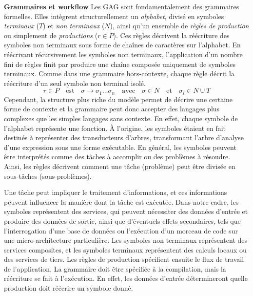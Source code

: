\textbf{Grammaires et workflow}
Les GAG sont fondamentalement des grammaires formelles. Elles intègrent structurellement un \textit{alphabet}, divisé en symboles \textit{terminaux} ($T$) et \textit{non terminaux} ($N$), ainsi qu'un ensemble de \textit{règles de production} ou simplement de \textit{productions} ($r \in P$). Ces règles décrivent la réécriture des symboles non terminaux sous forme de chaînes de caractères sur l'alphabet. En réécrivant récursivement les symboles non terminaux, l'application d'un nombre fini de règles finit par produire une chaîne composée uniquement de symboles terminaux. Comme dans une grammaire hors-contexte, chaque règle décrit la réécriture d'un seul symbole non terminal isolé. 
\begin{equation}
    r \in P \quad \text{est} \quad \sigma \rightarrow \sigma_1 \ldots \sigma_n \quad \text{avec} \quad \sigma \in N \quad \text{et} \quad \sigma_i \in N \cup T 
\end{equation}
Cependant, la structure plus riche du modèle permet de décrire une certaine forme de contexte et la grammaire peut donc accepter des langages plus complexes que les simples langages sans contexte. En effet, chaque symbole de l'alphabet représente une fonction. À l'origine, les symboles étaient en fait destinés à représenter des transducteurs d'arbres, transformant l'arbre d'analyse d'une expression sous une forme exécutable. En général, les symboles peuvent être interprétés comme des tâches à accomplir ou des problèmes à résoudre. Ainsi, les règles décrivent comment une tâche (problème) peut être divisée en sous-tâches (sous-problèmes). 

Une tâche peut impliquer le traitement d'informations, et ces informations peuvent influencer la manière dont la tâche est exécutée. Dans notre cadre, les symboles représentent des services, qui peuvent nécessiter des données d'entrée et produire des données de sortie, ainsi que d'éventuels effets secondaires, tels que l'interrogation d'une base de données ou l'exécution d'un morceau de code sur une micro-architecture particulière. Les symboles non terminaux représentent des services composites, et les symboles terminaux représentent des calculs locaux ou des services de tiers. Les règles de production spécifient ensuite le flux de travail de l'application. La grammaire doit être spécifiée à la compilation, mais la réécriture se fait à l'exécution. En effet, les données d'entrée détermineront quelle production doit réécrire un symbole donné.

